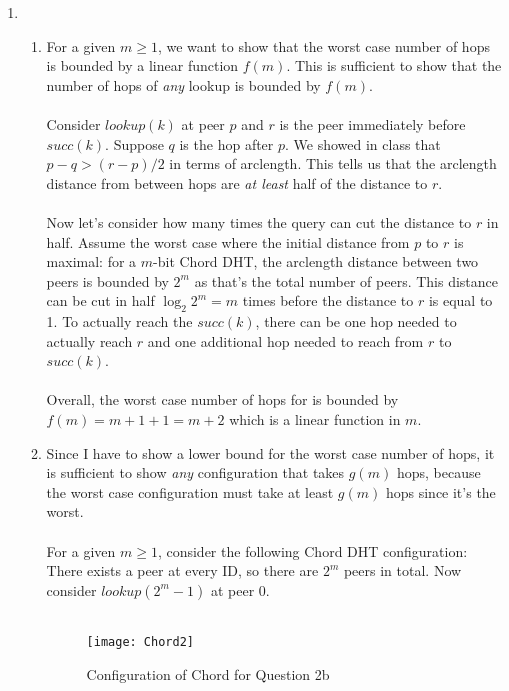 \documentclass[12pt]{article}
\begin{document}
\begin{enumerate}
	\item 
	\begin{enumerate}
	\item For a given $m \ge 1$, we want to show that the worst case number of hops is bounded by a linear function $f(m)$. This is sufficient to show that the number of hops of \emph{any} lookup is bounded by $f(m)$. \\ \\
	Consider $lookup(k)$ at peer $p$ and $r$ is the peer immediately before $succ(k)$. Suppose $q$ is the hop after $p$. We showed in class that $p - q > (r - p)/2$ in terms of arclength. This tells us that the arclength distance from between hops are \emph{at least} half of the distance to $r$. \\ \\
	Now let's consider how many times the query can cut the distance to $r$ in half. Assume the worst case where the initial distance from $p$ to $r$ is maximal: for a $m$-bit Chord DHT, the arclength distance between two peers is bounded by $2^m$ as that's the total number of peers. This distance can be cut in half $\log_2{2^m} = m$ times before the distance to $r$ is equal to 1. To actually reach the $succ(k)$, there can be one hop needed to actually reach $r$ and one additional hop needed to reach from $r$ to $succ(k)$. \\ \\
	Overall, the worst case number of hops for  is bounded by $f(m) = m + 1 + 1 = m + 2$ which is a linear function in $m$. \\
	\item Since I have to show a lower bound for the worst case number of hops, it is sufficient to show \emph{any} configuration that takes $g(m)$ hops, because the worst case configuration must take at least $g(m)$ hops since it's the worst. \\ \\
	For a given $m \ge 1$, consider the following Chord DHT configuration: There exists a peer at every ID, so there are $2^m$ peers in total. Now consider $lookup(2^m - 1)$ at peer $0$. \\ \\ 
    \begin{figure}[!ht]
    \centering
    \texttt{[image: Chord2]}
    \caption{Configuration of Chord for Question 2b}
	\end{figure}
	

\end{enumerate}
\end{enumerate}
\end{document}

